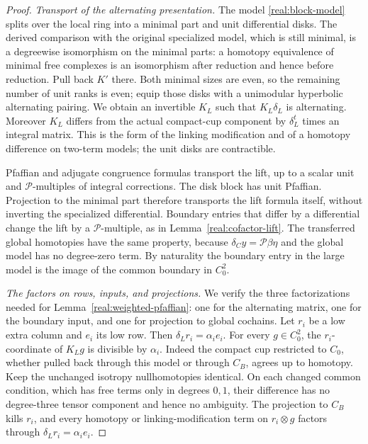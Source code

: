 \begin{proof}
\emph{Transport of the alternating presentation.}
The model \eqref{real:block-model} splits over the local ring into a
minimal part and unit differential disks. The derived comparison with
the original specialized model, which is still minimal, is a
degreewise isomorphism on the minimal parts: a homotopy equivalence
of minimal free complexes is an isomorphism after reduction and hence
before reduction. Pull back \(K'\) there. Both minimal sizes are even,
so the remaining number of unit ranks is even; equip those disks
with a unimodular hyperbolic alternating pairing. We obtain an
invertible \(K_L\) such that \(K_L\delta_L\) is alternating.
Moreover \(K_L\) differs from the actual compact-cup component by
\(\delta_L^t\) times an integral matrix. This is the form of the
linking modification and of a homotopy difference on two-term
models; the unit disks are contractible.

Pfaffian and adjugate congruence formulas transport the lift, up to a
scalar unit and \(\mathcal P\)-multiples of integral corrections.
The disk block has unit Pfaffian. Projection to the minimal part
therefore transports the lift formula itself, without inverting the
specialized differential. Boundary entries that differ by a
differential change the lift by a \(\mathcal P\)-multiple, as in
Lemma~\ref{real:cofactor-lift}. The transferred global homotopies have
the same property, because \(\delta_Cy=\mathcal P\beta\eta\) and the
global model has no degree-zero term. By naturality the boundary
entry in the large model is the image of the common boundary in
\(C_0^2\).

\emph{The factors on rows, inputs, and projections.}
We verify the three factorizations needed for
Lemma~\ref{real:weighted-pfaffian}: one for the alternating matrix,
one for the boundary input, and one for projection to global cochains.
Let \(r_i\) be a low extra column and \(e_i\) its low row. Then
\(\delta_Lr_i=\alpha_i e_i\). For every \(g\in C_0^2\), the
\(r_i\)-coordinate of \(K_Lg\) is divisible by \(\alpha_i\).
Indeed the compact cup restricted to \(C_0\), whether pulled back
through this model or through \(C_B\), agrees up to homotopy. Keep
the unchanged isotropy nullhomotopies identical. On each changed
common condition, which has free terms only in degrees \(0,1\),
their difference has no degree-three tensor component and hence no
ambiguity. The projection to \(C_B\) kills \(r_i\), and every
homotopy or linking-modification term on \(r_i\otimes g\) factors
through \(\delta_Lr_i=\alpha_i e_i\).


\end{proof}
